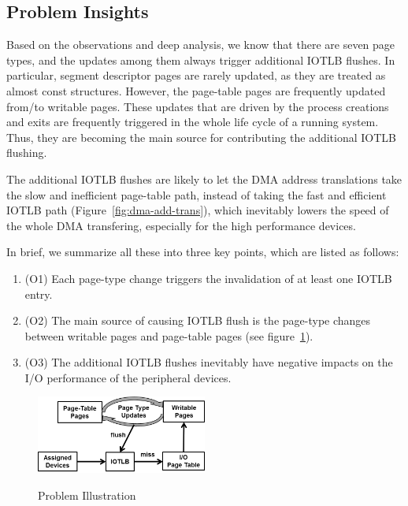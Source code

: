 \subsection{Problem Insights} \label{sec:insight}
Based on the observations and deep analysis, we know that there are seven page types, and the updates among them always trigger additional IOTLB flushes.
In particular, segment descriptor pages are rarely updated, as they are treated as almost const structures.
However, the page-table pages are frequently updated from/to writable pages.
These updates that are driven by the process creations and exits are frequently triggered in the whole life cycle of a running system.
Thus, they are becoming the main source for contributing the additional IOTLB flushing.

The additional IOTLB flushes are likely to let the DMA address
translations take the slow and inefficient page-table path,
instead of taking the fast and efficient IOTLB path (Figure~\ref{fig:dma-add-trans}), which inevitably lowers the
speed of the whole DMA transfering, especially for the high performance devices.


In brief, we summarize all these into three key points, which are listed as follows:
\begin{enumerate}
\item (O1) Each page-type change triggers the invalidation of at least one IOTLB entry.
\item (O2) The main source of causing IOTLB flush is the page-type changes between writable pages and page-table pages (see figure~\ref{fig:pro-ill}).
\item (O3) The additional IOTLB flushes inevitably have negative impacts on the I/O performance of the peripheral devices.
\end{enumerate}

\begin{figure}[ht]
\centering
\includegraphics[width=0.5\textwidth]{image/background/problem-illustration.png} \\
\caption{Problem Illustration}
\label{fig:pro-ill}
\end{figure}

